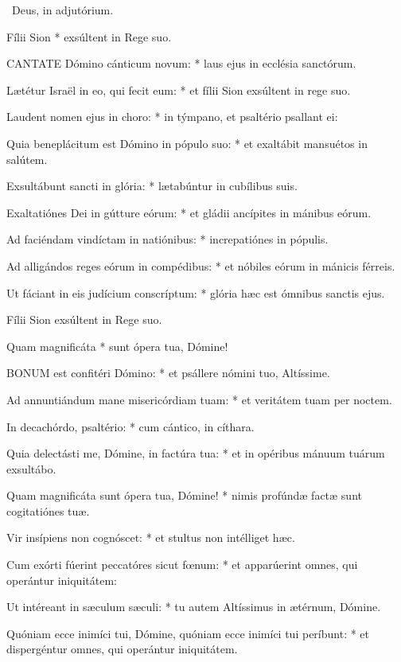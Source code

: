 \V\ Deus, in adjutórium.

 Fílii Sion * exsúltent in Rege suo.


\lettrine[lines=2]{C}{ANTATE} Dómino cánticum novum: * laus ejus in ecclésia sanctórum.

Lætétur Israël in eo, qui fecit eum: * et fílii Sion exsúltent in rege suo.

Laudent nomen ejus in choro: * in týmpano, et psaltério psallant ei:

Quia beneplácitum est Dómino in pópulo suo: * et exaltábit mansuétos in salútem.

Exsultábunt sancti in glória: * lætabúntur in cubílibus suis.

Exaltatiónes Dei in gútture eórum: * et gládii ancípites in mánibus eórum.

Ad faciéndam vindíctam in natiónibus: * increpatiónes in pópulis.

Ad alligándos reges eórum in compédibus: * et nóbiles eórum in mánicis férreis.

Ut fáciant in eis judícium conscríptum: * glória hæc est ómnibus sanctis ejus.

 Fílii Sion exsúltent in Rege suo.

 Quam magnificáta * sunt ópera tua, Dómine!


\lettrine[lines=2]{B}{ONUM} est confitéri Dómino: * et psállere nómini tuo, Altíssime.

Ad annuntiándum mane misericórdiam tuam: * et veritátem tuam per noctem.

In decachórdo, psaltério: * cum cántico, in cíthara.

Quia delectásti me, Dómine, in factúra tua: * et in opéribus mánuum tuárum exsultábo.

Quam magnificáta sunt ópera tua, Dómine! * nimis profúndæ factæ sunt cogitatiónes tuæ.

Vir insípiens non cognóscet: * et stultus non intélliget hæc.

Cum exórti fúerint peccatóres sicut fœnum: * et apparúerint omnes, qui operántur iniquitátem:

Ut intéreant in sæculum sæculi: * tu autem Altíssimus in ætérnum, Dómine.

Quóniam ecce inimíci tui, Dómine, quóniam ecce inimíci tui períbunt: * et dispergéntur omnes, qui operántur iniquitátem.


